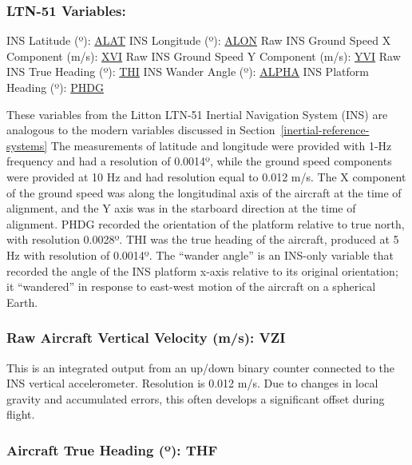 \documentclass[
  english,
]{book}
\begin{document}
\hypertarget{ltn51}{%
\subsubsection*{LTN-51 Variables:}\label{ltn51}}

INS Latitude ({º}): \underline{ALAT}
INS Longitude ({º}): \underline{ALON}
Raw INS Ground Speed X Component (m/s): \underline{XVI}
Raw INS Ground Speed Y Component (m/s): \underline{YVI}
Raw INS True Heading ({º}): \underline{THI}
INS Wander Angle ({º}): \underline{ALPHA}
INS Platform Heading ({º}): \underline{PHDG}

These variables from the Litton LTN-51 Inertial Navigation System (INS) are analogous to the modern variables discussed in Section~\ref{inertial-reference-systems} The measurements of latitude and longitude were provided with 1-Hz frequency and had a resolution of 0.0014{º}, while the ground speed components were provided at 10 Hz and had resolution equal to 0.012 m/s. The X component of the ground speed was along the longitudinal axis of the aircraft at the time of alignment, and the Y axis was in the starboard direction at the time of alignment. PHDG recorded the orientation of the platform relative to true north, with resolution 0.0028{º}. THI was the true heading of the aircraft, produced at 5 Hz with resolution of 0.0014{º}. The ``wander angle'' is an INS-only variable that recorded the angle of the INS platform x-axis relative to its original orientation; it ``wandered'' in response to east-west motion of the aircraft on a spherical Earth.

\hypertarget{vzi}{%
\subsubsection*{Raw Aircraft Vertical Velocity (m/s): VZI}\label{vzi}}

This is an integrated output from an up/down binary counter connected to the INS vertical accelerometer. Resolution is 0.012 m/s. Due to changes in local gravity and accumulated errors, this often develops a significant offset during flight.

\hypertarget{thf}{%
\subsubsection*{\texorpdfstring{Aircraft True Heading ({º}): THF}{Aircraft True Heading (º): THF}}\label{thf}}
\end{document}
